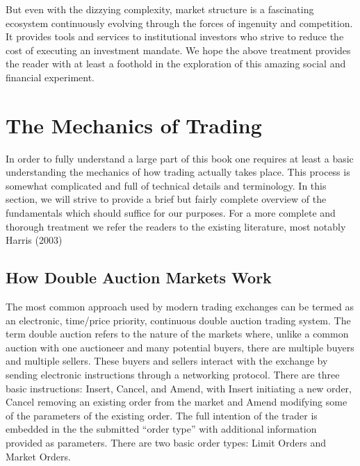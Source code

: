 But even with the dizzying complexity, market structure is a fascinating ecosystem continuously evolving through the forces of ingenuity and competition. It provides tools and services to institutional investors who strive to reduce the cost of executing an investment mandate. We hope the above treatment provides the reader with at least a foothold in the exploration of this amazing social and financial experiment.



\section{The Mechanics of Trading}

In order to fully understand a large part of this book one requires at least a basic understanding the mechanics of how trading actually takes place. This process is somewhat complicated and full of technical details and terminology. In this section, we will strive to provide a brief but fairly complete overview of the fundamentals which should suffice for our purposes. For a more complete and thorough treatment we refer the readers to the existing literature, most notably Harris (2003)~\cite{harris03trade}


\subsection{How Double Auction Markets Work}

The most common approach used by modern trading exchanges can be termed as an electronic, time/price priority, continuous double auction trading system. The term double auction refers to the nature of the markets where, unlike a common auction with one auctioneer and many potential buyers, there are multiple buyers and multiple sellers. These buyers and sellers interact with the exchange by sending electronic instructions through a networking protocol. There are three basic instructions: Insert, Cancel, and Amend, with Insert initiating a new order, Cancel removing an existing order from the market and Amend modifying some of the parameters of the existing order. The full intention of the trader is embedded in the the submitted ``order type'' with additional information provided as parameters. There are two basic order types: Limit Orders and Market Orders.


